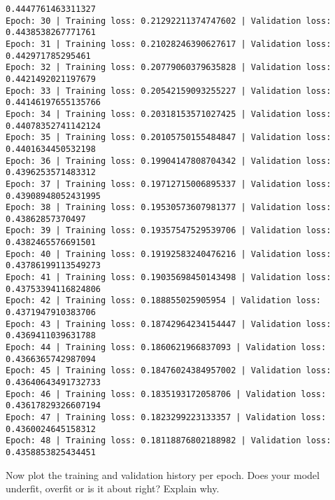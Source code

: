 \documentclass[11pt]{article}
\begin{document}
\begin{Verbatim}[commandchars=\\\{\}]
0.4447761463311327
Epoch: 30 | Training loss: 0.21292211374747602 | Validation loss:
0.4438538267771761
Epoch: 31 | Training loss: 0.21028246390627617 | Validation loss:
0.442971785295461
Epoch: 32 | Training loss: 0.20779060379635828 | Validation loss:
0.4421492021197679
Epoch: 33 | Training loss: 0.20542159093255227 | Validation loss:
0.44146197655135766
Epoch: 34 | Training loss: 0.20318153571027425 | Validation loss:
0.44078352741142124
Epoch: 35 | Training loss: 0.20105750155484847 | Validation loss:
0.4401634450532198
Epoch: 36 | Training loss: 0.19904147808704342 | Validation loss:
0.4396253571483312
Epoch: 37 | Training loss: 0.19712715006895337 | Validation loss:
0.43908948052431995
Epoch: 38 | Training loss: 0.19530573607981377 | Validation loss:
0.43862857370497
Epoch: 39 | Training loss: 0.19357547529539706 | Validation loss:
0.4382465576691501
Epoch: 40 | Training loss: 0.19192583240476216 | Validation loss:
0.43786199113549273
Epoch: 41 | Training loss: 0.19035698450143498 | Validation loss:
0.43753394116824806
Epoch: 42 | Training loss: 0.188855025905954 | Validation loss:
0.4371947910383706
Epoch: 43 | Training loss: 0.18742964234154447 | Validation loss:
0.4369411039631788
Epoch: 44 | Training loss: 0.1860621966837093 | Validation loss:
0.4366365742987094
Epoch: 45 | Training loss: 0.18476024384957002 | Validation loss:
0.43640643491732733
Epoch: 46 | Training loss: 0.1835193172058706 | Validation loss:
0.43617829326607194
Epoch: 47 | Training loss: 0.1823299223133357 | Validation loss:
0.4360024645158312
Epoch: 48 | Training loss: 0.18118876802188982 | Validation loss:
0.4358853825434451
    \end{Verbatim}

    Now plot the training and validation history per epoch. Does your model
underfit, overfit or is it about right? Explain why.
\end{document}
